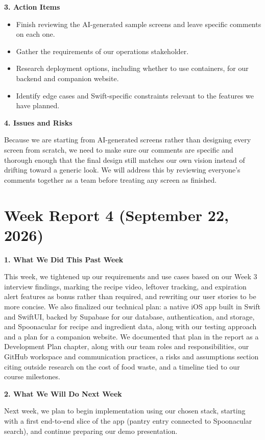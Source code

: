 \noindent\textbf{3. Action Items}
\begin{itemize}
\item Finish reviewing the AI-generated sample screens and leave specific comments on each one.
\item Gather the requirements of our operations stakeholder.
\item Research deployment options, including whether to use containers, for our backend and companion website.
\item Identify edge cases and Swift-specific constraints relevant to the features we have planned.
\end{itemize}

\noindent\textbf{4. Issues and Risks}

Because we are starting from AI-generated screens rather than designing every screen from scratch, we need to make sure our comments are specific and thorough enough that the final design still matches our own vision instead of drifting toward a generic look. We will address this by reviewing everyone's comments together as a team before treating any screen as finished.

\section{Week Report 4 (September 22, 2026)}

\noindent\textbf{1. What We Did This Past Week}

This week, we tightened up our requirements and use cases based on our Week 3 interview findings, marking the recipe video, leftover tracking, and expiration alert features as bonus rather than required, and rewriting our user stories to be more concise. We also finalized our technical plan: a native iOS app built in Swift and SwiftUI, backed by Supabase for our database, authentication, and storage, and Spoonacular for recipe and ingredient data, along with our testing approach and a plan for a companion website. We documented that plan in the report as a Development Plan chapter, along with our team roles and responsibilities, our GitHub workspace and communication practices, a risks and assumptions section citing outside research on the cost of food waste, and a timeline tied to our course milestones.

\noindent\textbf{2. What We Will Do Next Week}

Next week, we plan to begin implementation using our chosen stack, starting with a first end-to-end slice of the app (pantry entry connected to Spoonacular search), and continue preparing our demo presentation.

